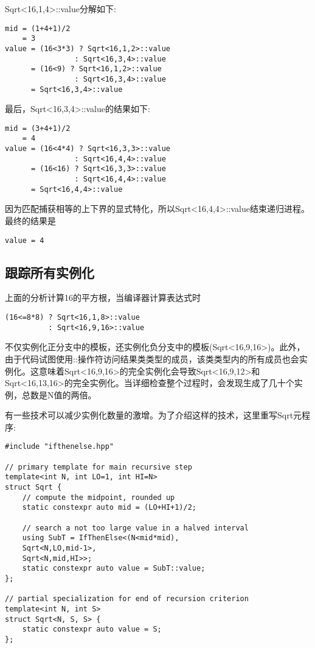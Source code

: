 Sqrt<16,1,4>::value分解如下:

\begin{lstlisting}[style=styleCXX]
mid = (1+4+1)/2
	= 3
value = (16<3*3) ? Sqrt<16,1,2>::value
				: Sqrt<16,3,4>::value
	  = (16<9) ? Sqrt<16,1,2>::value
				: Sqrt<16,3,4>::value
	  = Sqrt<16,3,4>::value
\end{lstlisting}

最后，Sqrt<16,3,4>::value的结果如下:

\begin{lstlisting}[style=styleCXX]
mid = (3+4+1)/2
	= 4
value = (16<4*4) ? Sqrt<16,3,3>::value
				: Sqrt<16,4,4>::value
	  = (16<16) ? Sqrt<16,3,3>::value
				: Sqrt<16,4,4>::value
	  = Sqrt<16,4,4>::value
\end{lstlisting}

因为匹配捕获相等的上下界的显式特化，所以Sqrt<16,4,4>::value结束递归进程。最终的结果是

\begin{lstlisting}[style=styleCXX]
value = 4
\end{lstlisting}

\subsection{跟踪所有实例化}

上面的分析计算16的平方根，当编译器计算表达式时

\begin{lstlisting}[style=styleCXX]
(16<=8*8) ? Sqrt<16,1,8>::value
		  : Sqrt<16,9,16>::value
\end{lstlisting}

不仅实例化正分支中的模板，还实例化负分支中的模板(Sqrt<16,9,16>)。此外，由于代码试图使用::操作符访问结果类类型的成员，该类类型内的所有成员也会实例化。这意味着Sqrt<16,9,16>的完全实例化会导致Sqrt<16,9,12>和Sqrt<16,13,16>的完全实例化。当详细检查整个过程时，会发现生成了几十个实例，总数是N值的两倍。

有一些技术可以减少实例化数量的激增。为了介绍这样的技术，这里重写Sqrt元程序:

\begin{lstlisting}[style=styleCXX]
#include "ifthenelse.hpp"

// primary template for main recursive step
template<int N, int LO=1, int HI=N>
struct Sqrt {
	// compute the midpoint, rounded up
	static constexpr auto mid = (LO+HI+1)/2;
	
	// search a not too large value in a halved interval
	using SubT = IfThenElse<(N<mid*mid),
	Sqrt<N,LO,mid-1>,
	Sqrt<N,mid,HI>>;
	static constexpr auto value = SubT::value;
};

// partial specialization for end of recursion criterion
template<int N, int S>
struct Sqrt<N, S, S> {
	static constexpr auto value = S;
};
\end{lstlisting}

